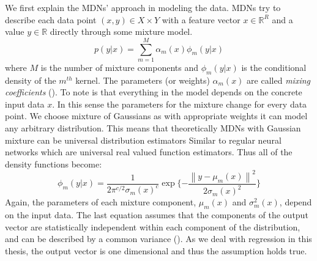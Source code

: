 \documentclass[12pt,a4paper,twoside]{scrartcl}
\numberwithin{equation}{section}
\begin{document}
We first explain the MDNs' approach in modeling the data. MDNs try to describe each data point \((x,y)\in X\times Y\) with a feature vector \(x\in\mathbb{R}^R\) and a value \(y\in\mathbb{R}\) directly through some mixture model.
\begin{equation}
p(y|x)=\sum_{m=1}^M \alpha_m(x)\phi_m(y|x)
\end{equation}
where \(M\) is the number of mixture components and \(\phi_m(y|x)\) is the conditional density of the \(m^{th}\) kernel. The parameters (or weights) \(\alpha_m(x)\) are called \emph{mixing coefficients} (\cite{bishop1994}). To note is that everything in the model depends on the concrete input data \(x\). In this sense the parameters for the mixture change for every data point. We choose mixture of Gaussians as with appropriate weights it can model any arbitrary distribution. This means that theoretically MDNs with Gaussian mixture can be universal distribution estimators Similar to regular neural networks which are universal real valued function estimators. Thus all of the density functions become:
\begin{equation}
\phi_m(y|x) = \frac{1}{2\pi^{c/2}\sigma_m(x)^c}\exp\{-\frac{\left\lVert y - \mu_m(x) \right\rVert^2}{2\sigma_m(x)^2}\}
\end{equation}
Again, the parameters of each mixture component, \(\mu_m(x)\) and \(\sigma_m^2(x)\), depend on the input data. The last equation assumes that the components of the output vector are statistically independent within each component of the distribution, and can be described by a common variance (\cite{bishop1994}). As we deal with regression in this thesis, the output vector is one dimensional and thus the assumption holds true.
\end{document}
